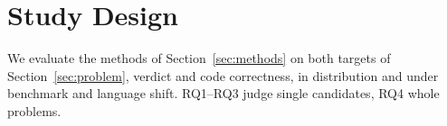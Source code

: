 
\section{Study Design}
We evaluate the methods of Section~\ref{sec:methods} on both targets of
Section~\ref{sec:problem}, verdict and code correctness, in distribution and under benchmark and language
shift. RQ1--RQ3 judge single candidates, RQ4 whole problems.




